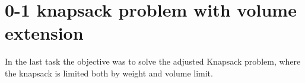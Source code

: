 \section{0-1 knapsack problem with volume extension}
In the last task the objective was to solve the adjusted Knapsack problem, where the knapsack is limited both by weight and volume limit.

